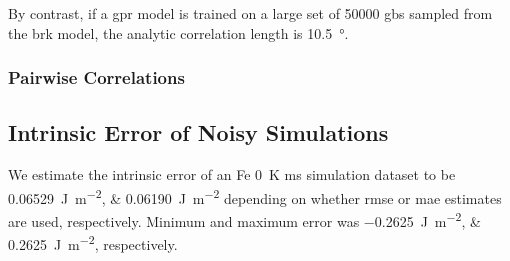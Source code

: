 \documentclass[final,twocolumn,12pt]{elsarticle}
\begin{document}
    By contrast, if a \gls{gpr} model is trained on a large set of \num{50000} \glspl{gb} sampled from the \gls{brk} model, the analytic correlation length is \SI{10.5}{\degree}.

    \subsubsection{Pairwise Correlations} \label{sec:results:correlation:pairwise}
%	
	\subsection{Intrinsic Error of Noisy  Simulations} \label{sec:results:error}
	We estimate the intrinsic error of an Fe \SI{0}{\kelvin} \gls{ms} simulation dataset to be \SIlist{0.06529;0.06190}{\joule\per\square\meter} depending on whether \gls{rmse} or \gls{mae} estimates are used, respectively. Minimum and maximum error was \SIlist{-0.2625;0.2625}{\joule\per\square\meter}, respectively.
\end{document}
